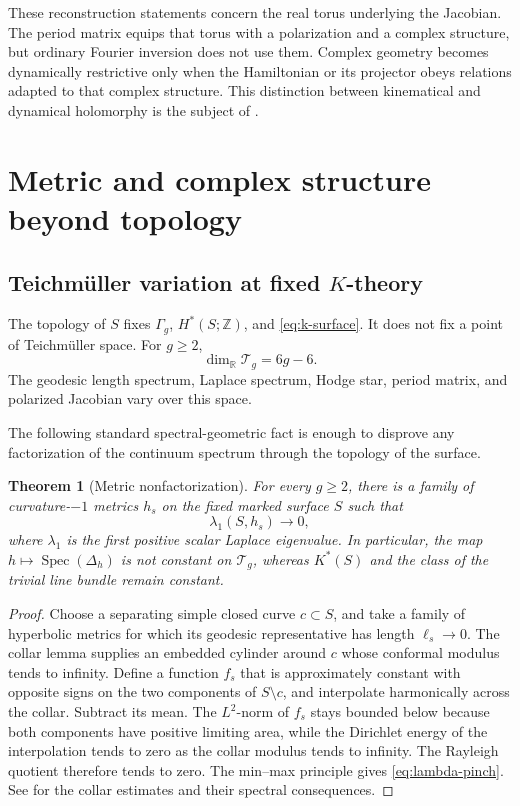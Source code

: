 \documentclass[11pt]{article}
\newtheorem{theorem}{Theorem}[section]
\theoremstyle{definition}
\theoremstyle{remark}
\newcommand{\RR}{\mathbb R}
\newcommand{\ZZ}{\mathbb Z}
\newcommand{\spec}{\operatorname{Spec}}
\newcommand{\cT}{\mathcal T}
\begin{document}
These reconstruction statements concern the real torus underlying the
Jacobian.  The period matrix equips that torus with a polarization and a
complex structure, but ordinary Fourier inversion does not use them.  Complex
geometry becomes dynamically restrictive only when the Hamiltonian or its
projector obeys relations adapted to that complex structure.  This distinction
between kinematical and dynamical holomorphy is the subject of
.

\section{Metric and complex structure beyond topology}
\label{sec:metric-complex}

\subsection{Teichm\"uller variation at fixed
  \texorpdfstring{\(K\)}{K}-theory}

The topology of \(S\) fixes \(\Gamma_g\), \(H^*(S;\ZZ)\), and
\eqref{eq:k-surface}.  It does not fix a point of Teichm\"uller space.
For \(g\geq2\),
\[
              \dim_\RR\cT_g=6g-6.
              \tag{5.1}\label{eq:teich-dim}
\]
The geodesic length spectrum, Laplace spectrum, Hodge star, period matrix, and
polarized Jacobian vary over this space.

The following standard spectral-geometric fact is enough to disprove any
factorization of the continuum spectrum through the topology of the surface.

\begin{theorem}[Metric nonfactorization]
\label{thm:metric-nonfactorization}
For every \(g\geq2\), there is a family of curvature-\(-1\) metrics \(h_s\) on
the fixed marked surface \(S\) such that
\[
                   \lambda_1(S,h_s)\longrightarrow0,
                   \tag{5.2}\label{eq:lambda-pinch}
\]
where \(\lambda_1\) is the first positive scalar Laplace eigenvalue.  In
particular, the map \(h\mapsto\spec(\Delta_h)\) is not constant on
\(\cT_g\), whereas \(K^*(S)\) and the class of the trivial line bundle remain
constant.
\end{theorem}

\begin{proof}
Choose a separating simple closed curve \(c\subset S\), and take a family of
hyperbolic metrics for which its geodesic representative has length
\(\ell_s\to0\).  The collar lemma supplies an embedded cylinder around \(c\)
whose conformal modulus tends to infinity.  Define a function \(f_s\) that is
approximately constant with opposite signs on the two components of
\(S\setminus c\), and interpolate harmonically across the collar.  Subtract
its mean.  The \(L^2\)-norm of \(f_s\) stays bounded below because both
components have positive limiting area, while the Dirichlet energy of the
interpolation tends to zero as the collar modulus tends to infinity.  The
Rayleigh quotient therefore tends to zero.  The min--max principle gives
\eqref{eq:lambda-pinch}.  See \cite{Buser} for the collar estimates and their
spectral consequences.
\end{proof}
\end{document}
